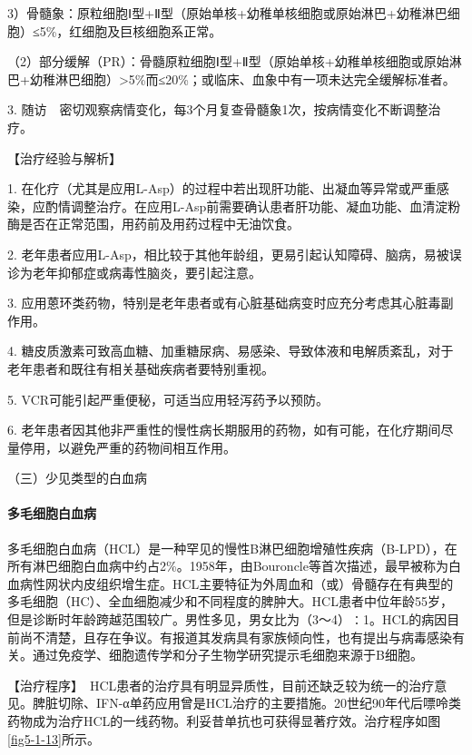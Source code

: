 3）骨髓象：原粒细胞Ⅰ型+Ⅱ型（原始单核+幼稚单核细胞或原始淋巴+幼稚淋巴细胞）≤5\%，红细胞及巨核细胞系正常。

（2）部分缓解（PR）：骨髓原粒细胞Ⅰ型+Ⅱ型（原始单核+幼稚单核细胞或原始淋巴+幼稚淋巴细胞）\textgreater{}5\%而≤20\%；或临床、血象中有一项未达完全缓解标准者。

3.
随访　密切观察病情变化，每3个月复查骨髓象1次，按病情变化不断调整治疗。

【治疗经验与解析】

1.
在化疗（尤其是应用L-Asp）的过程中若出现肝功能、出凝血等异常或严重感染，应酌情调整治疗。在应用L-Asp前需要确认患者肝功能、凝血功能、血清淀粉酶是否在正常范围，用药前及用药过程中无油饮食。

2.
老年患者应用L-Asp，相比较于其他年龄组，更易引起认知障碍、脑病，易被误诊为老年抑郁症或病毒性脑炎，要引起注意。

3.
应用蒽环类药物，特别是老年患者或有心脏基础病变时应充分考虑其心脏毒副作用。

4.
糖皮质激素可致高血糖、加重糖尿病、易感染、导致体液和电解质紊乱，对于老年患者和既往有相关基础疾病者要特别重视。

5. VCR可能引起严重便秘，可适当应用轻泻药予以预防。

6.
老年患者因其他非严重性的慢性病长期服用的药物，如有可能，在化疗期间尽量停用，以避免严重的药物间相互作用。

{（三）少见类型的白血病}

\paragraph{多毛细胞白血病}

多毛细胞白血病（HCL）是一种罕见的慢性B淋巴细胞增殖性疾病（B-LPD），在所有淋巴细胞白血病中约占2\%。1958年，由Bouroncle等首次描述，最早被称为白血病性网状内皮组织增生症。HCL主要特征为外周血和（或）骨髓存在有典型的多毛细胞（HC）、全血细胞减少和不同程度的脾肿大。HCL患者中位年龄55岁，但是诊断时年龄跨越范围较广。男性多见，男女比为（3～4）∶1。HCL的病因目前尚不清楚，且存在争议。有报道其发病具有家族倾向性，也有提出与病毒感染有关。通过免疫学、细胞遗传学和分子生物学研究提示毛细胞来源于B细胞。

【治疗程序】　HCL患者的治疗具有明显异质性，目前还缺乏较为统一的治疗意见。脾脏切除、IFN-α单药应用曾是HCL治疗的主要措施。20世纪90年代后嘌呤类药物成为治疗HCL的一线药物。利妥昔单抗也可获得显著疗效。治疗程序如图\ref{fig5-1-13}所示。

